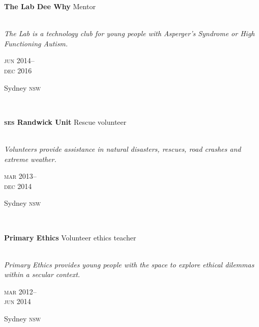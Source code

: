 \begin{minipage}[t]{\mainboxwidth\textwidth}
\textbf{The Lab Dee Why}\phantom{..} Mentor \\
\\
{\small
\textit{The Lab is a technology club for young people with Asperger’s Syndrome or High Functioning Autism.}
\par}
\end{minipage}
\begin{minipage}[t]{\detailboxwidth\textwidth}
{
\hfill \textsc{jun} 2014--\\ 
\hspace*{0pt} \hfill \textsc{dec} 2016
\par
{\small\hfill Sydney \textsc{nsw}}
}
\end{minipage}
\\


\begin{minipage}[t]{\mainboxwidth\textwidth}
\textbf{\textsc{ses} Randwick Unit}\phantom{..} Rescue volunteer\\
\\
{\small
\textit{Volunteers provide assistance in natural disasters, rescues, road crashes and extreme weather.}
\par}
\end{minipage}
\begin{minipage}[t]{\detailboxwidth\textwidth}
{
\hfill \textsc{mar} 2013--\\ 
\hspace*{0pt} \hfill \textsc{dec} 2014
\par
{\small\hfill Sydney \textsc{nsw}}
}
\end{minipage}
\\

\begin{minipage}[t]{\mainboxwidth\textwidth}
\textbf{Primary Ethics}\phantom{..} Volunteer ethics teacher\\
\\
{\small
\textit{Primary Ethics provides young people with the space to explore ethical dilemmas within a secular context.}
\par}
\end{minipage}
\begin{minipage}[t]{\detailboxwidth\textwidth}
{
\hfill \textsc{mar} 2012--\\ 
\hspace*{0pt} \hfill \textsc{jun} 2014
\par
{\small\hfill Sydney \textsc{nsw}}
}
\end{minipage}

